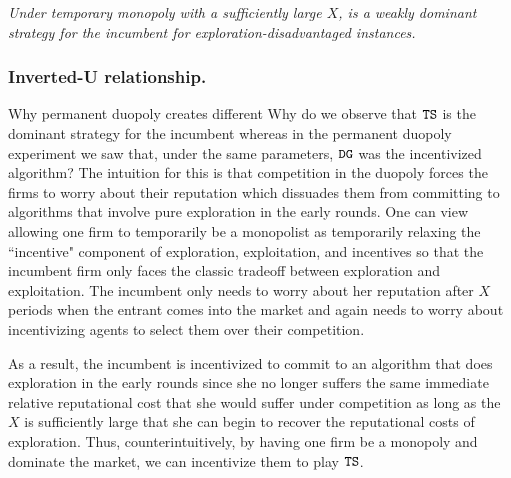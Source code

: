 \documentclass[../competing_bandits.tex]{subfiles}
\begin{document}
\begin{finding}\label{find:temp-monopoly-entrant}
\textit{Under temporary monopoly with a sufficiently large $X$, \DG is a weakly dominant strategy for the incumbent for exploration-disadvantaged instances.
}
\end{finding}



\subsubsection{Inverted-U relationship.}


Why permanent duopoly creates different 
Why do we observe that $\mathtt{TS}$ is the dominant strategy for the incumbent whereas in the permanent duopoly experiment we saw that, under the same parameters, $\mathtt{DG}$ was the incentivized algorithm? The intuition for this is that competition in the duopoly forces the firms to worry about their reputation which dissuades them from committing to algorithms that involve pure exploration in the early rounds. One can view allowing one firm to temporarily be a monopolist as temporarily relaxing the ``incentive" component of exploration, exploitation, and incentives so that the incumbent firm only faces the classic tradeoff between exploration and exploitation. The incumbent only needs to worry about her reputation after $X$ periods when the entrant comes into the market and again needs to worry about incentivizing agents to select them over their competition.

As a result, the incumbent is incentivized to commit to an algorithm that does exploration in the early rounds since she no longer suffers the same immediate relative reputational cost that she would suffer under competition as long as the $X$ is sufficiently large that she can begin to recover the reputational costs of exploration. Thus, counterintuitively, by having one firm be a monopoly and dominate the market, we can incentivize them to play $\mathtt{TS}$.
\end{document}

